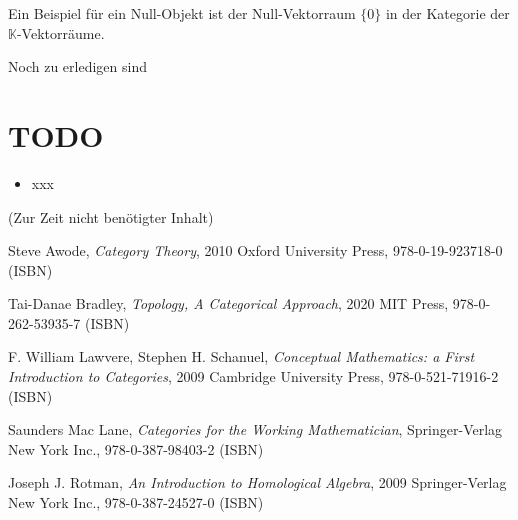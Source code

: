 \documentclass[a4paper]{amsart}
\theoremstyle{definition}
\newcommand{\K}{\ensuremath{\mathbb{ K }}}
\begin{document}
Ein Beispiel für ein Null-Objekt ist der Null-Vektorraum $\{ 0 \}$ in der Kategorie der $\K$-Vektorräume.

\begin{backup}
Noch zu erledigen sind
\section{TODO}
\begin{itemize}
   \item xxx
\end{itemize}
\end{backup}

\begin{backup}
    (Zur Zeit nicht benötigter Inhalt)
\end{backup}

\begin{thebibliography}{9}
      Steve Awode, \emph{Category Theory},
      2010 Oxford University Press, 978-0-19-923718-0 (ISBN)

      Tai-Danae Bradley, \emph{Topology, A Categorical Approach},
      2020 MIT Press, 978-0-262-53935-7 (ISBN)

      F. William Lawvere, Stephen H. Schanuel, \emph{Conceptual Mathematics: a First Introduction to Categories},
      2009 Cambridge University Press, 978-0-521-71916-2 (ISBN)

      Saunders Mac Lane, \emph{Categories for the Working Mathematician},
      Springer-Verlag New York Inc., 978-0-387-98403-2 (ISBN)

   	Joseph J. Rotman, \emph{An Introduction to Homological Algebra},
   	2009 Springer-Verlag New York Inc., 978-0-387-24527-0 (ISBN)
      
\end{thebibliography}
\end{document}
